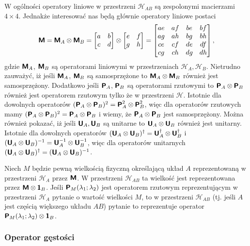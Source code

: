 \documentclass{myclass}
\begin{document}
W ogólności operatory liniowe w przestrzeni \(\mathscr{H}_{AB}\) są zespolonymi macierzami \(4\times
4\). Jednakże interesować nas będą głównie operatory liniowe postaci
\begin{equation*}
    \oper{M} = \oper{M}_A \otimes \oper{M}_B = \mqty[a & b \\ c & d] \otimes \mqty[e & f\\ g & h] = \mqty[ae & af & be & bf \\ ag & ah & bg & bh \\ ce & cf & de & df \\ cg & ch & dg & dh]\,,
\end{equation*}
gdzie \(\boldsymbol{\mathsf{M}}_A\), \(\boldsymbol{\mathsf{M}}_B\) są operatorami liniowymi w przestrzeniach \(\mathscr{H}_A,
\mathscr{H}_B\). Nietrudno zauważyć, iż jeśli \(\boldsymbol{\mathsf{M}}_A\), \(\boldsymbol{\mathsf{M}}_B\) są samosprzężone to
\(\boldsymbol{\mathsf{M}}_A \otimes \boldsymbol{\mathsf{M}}_B\) również jest samosprzężony. Dodatkowo jeśli \(\boldsymbol{\mathsf{P}}_A\),
\(\boldsymbol{\mathsf{P}}_B\) są operatorami rzutowymi to \(\boldsymbol{\mathsf{P}}_A \otimes \boldsymbol{\mathsf{P}}_B\) również jest operatorem
rzutowym tylko że w przestrzeni \(\mathscr{H}\). Istotnie dla dowolnych operatorów \((\boldsymbol{\mathsf{P}}_A
\otimes \boldsymbol{\mathsf{P}}_B)^2 = \boldsymbol{\mathsf{P}}_A^2 \otimes \boldsymbol{\mathsf{P}}_B^2\), więc dla operatorów rzutowych mamy
\((\boldsymbol{\mathsf{P}}_A \otimes \boldsymbol{\mathsf{P}}_B)^2 = \boldsymbol{\mathsf{P}}_A \otimes \boldsymbol{\mathsf{P}}_B\) i wiemy, że \(\boldsymbol{\mathsf{P}}_A
\otimes \boldsymbol{\mathsf{P}}_B\) jest samosprzężony. Można również pokazać, iż jeśli \(\boldsymbol{\mathsf{U}}_A, \boldsymbol{\mathsf{U}}_B\)
są unitarne to \(\boldsymbol{\mathsf{U}}_A \otimes \boldsymbol{\mathsf{U}}_B\) również jest unitarny. Istotnie dla dowolnych
operatorów \((\boldsymbol{\mathsf{U}}_A \otimes \boldsymbol{\mathsf{U}}_B)^\dagger = \boldsymbol{\mathsf{U}}_A^\dagger\otimes\boldsymbol{\mathsf{U}}_B^\dagger\)
i \((\boldsymbol{\mathsf{U}}_A \otimes \boldsymbol{\mathsf{U}}_B)^{-1} = \boldsymbol{\mathsf{U}}_A^{-1}\otimes\boldsymbol{\mathsf{U}}_B^{-1}\), więc dla
operatorów unitarnych \((\boldsymbol{\mathsf{U}}_A \otimes \boldsymbol{\mathsf{U}}_B)^\dagger = (\boldsymbol{\mathsf{U}}_A \otimes
\boldsymbol{\mathsf{U}}_B)^{-1}\).

Niech \(M\) będzie pewną wielkością fizyczną określającą układ \(A\) reprezentowaną w przestrzeni
\(\mathscr{H}_A\) przez \(\boldsymbol{\mathsf{M}}\). W przestrzeni \(\mathscr{H}_{AB}\) ta wielkość jest
reprezentowana przez \(\boldsymbol{\mathsf{M}}\otimes\boldsymbol{\mathsf{1}}_B\). Jeśli \(\boldsymbol{\mathsf{P}}_M(\lambda_1 ; \lambda_2)\) jest
operatorem rzutowym reprezentującym w przestrzeni \(\mathscr{H}_A\) pytanie o wartość wielkości
\(M\), to w przestrzeni \(\mathscr{H}_{AB}\) (tj. jeśli \(A\) jest częścią większego układu \(AB\))
pytanie to reprezentuje operator \(\boldsymbol{\mathsf{P}}_M(\lambda_1;\lambda_2)\otimes\boldsymbol{\mathsf{1}}_B\).

\subsubsection{Operator gęstości}
\end{document}
